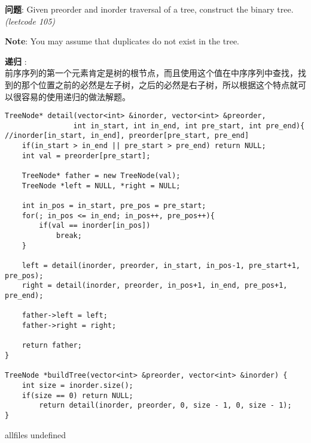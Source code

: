 \documentclass{article}
\begin{document}
\begin{CJK}{UTF8}{gbsn}     %

\else
	
\begin{description}
	\item{\textbf{问题}}: Given preorder and inorder traversal of a tree, construct the binary tree. \textit{(leetcode 105)}
	\item{\textbf{Note}}: You may assume that duplicates do not exist in the tree.
	\item{\textbf{递归}} : 
	\\前序序列的第一个元素肯定是树的根节点，而且使用这个值在中序序列中查找，找到的那个位置之前的必然是左子树，之后的必然是右子树，所以根据这个特点就可以很容易的使用递归的做法解题。
	\begin{lstlisting}
TreeNode* detail(vector<int> &inorder, vector<int> &preorder, 
				int in_start, int in_end, int pre_start, int pre_end){
//inorder[in_start, in_end], preorder[pre_start, pre_end]
	if(in_start > in_end || pre_start > pre_end) return NULL;
	int val = preorder[pre_start];

	TreeNode* father = new TreeNode(val);
	TreeNode *left = NULL, *right = NULL;
		
	int in_pos = in_start, pre_pos = pre_start;
	for(; in_pos <= in_end; in_pos++, pre_pos++){
		if(val == inorder[in_pos])
			break;
	}

	left = detail(inorder, preorder, in_start, in_pos-1, pre_start+1, pre_pos);
	right = detail(inorder, preorder, in_pos+1, in_end, pre_pos+1, pre_end);

	father->left = left;
	father->right = right;

	return father;
}

TreeNode *buildTree(vector<int> &preorder, vector<int> &inorder) {
	int size = inorder.size();
	if(size == 0) return NULL;
		return detail(inorder, preorder, 0, size - 1, 0, size - 1);
}
	\end{lstlisting}
	\textit{}
\end{description}

\fi

\ifx allfiles undefined
\end{CJK}
\end{document}
